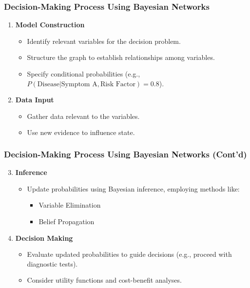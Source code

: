 \documentclass[aspectratio=169]{beamer}
\begin{document}
\begin{frame}[fragile]
    \frametitle{Decision-Making Process Using Bayesian Networks}
    \begin{enumerate}
        \item \textbf{Model Construction}
            \begin{itemize}
                \item Identify relevant variables for the decision problem.
                \item Structure the graph to establish relationships among variables.
                \item Specify conditional probabilities (e.g., $P(\text{Disease} | \text{Symptom A}, \text{Risk Factor}) = 0.8$).
            \end{itemize}
        \item \textbf{Data Input}
            \begin{itemize}
                \item Gather data relevant to the variables. 
                \item Use new evidence to influence state.
            \end{itemize}
    \end{enumerate}
\end{frame}

\begin{frame}[fragile]
    \frametitle{Decision-Making Process Using Bayesian Networks (Cont'd)}
    \begin{enumerate}
        \setcounter{enumi}{2}
        \item \textbf{Inference}
            \begin{itemize}
                \item Update probabilities using Bayesian inference, employing methods like:
                \begin{itemize}
                    \item Variable Elimination
                    \item Belief Propagation
                \end{itemize}
            \end{itemize}
        \item \textbf{Decision Making}
            \begin{itemize}
                \item Evaluate updated probabilities to guide decisions (e.g., proceed with diagnostic tests).
                \item Consider utility functions and cost-benefit analyses.
            \end{itemize}
    \end{enumerate}
\end{frame}
\end{document}
